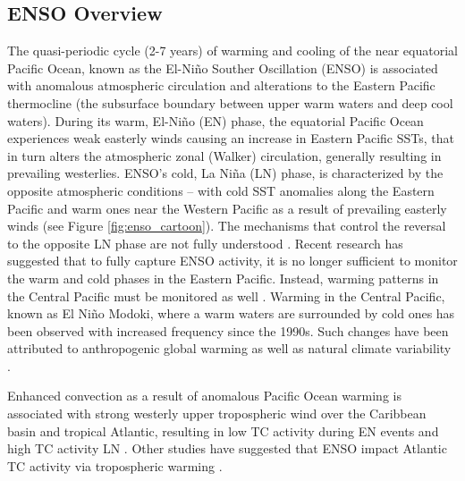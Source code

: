 \documentclass[]{article}
\begin{document}
\subsection{ENSO Overview}
The quasi-periodic cycle (2-7 years) of warming and cooling of the near equatorial Pacific Ocean, known as the El-Ni\~no Souther Oscillation (ENSO) is associated with anomalous atmospheric circulation and alterations to the Eastern Pacific thermocline (the subsurface boundary between upper warm waters and deep cool waters). During its warm, El-Ni\~no (EN) phase, the equatorial Pacific Ocean experiences weak easterly winds causing an increase in Eastern Pacific SSTs, that in turn alters the atmospheric zonal (Walker) circulation, generally resulting in prevailing westerlies. ENSO's cold, La Ni\~na (LN) phase, is characterized by the opposite atmospheric conditions -- with cold SST anomalies along the Eastern Pacific and warm ones near the Western Pacific as a result of prevailing easterly winds (see Figure \ref{fig:enso_cartoon}). The mechanisms that control the reversal to the opposite LN phase are not fully understood \cite{kirtman1997,smith2012}. Recent research has suggested that to fully capture ENSO activity, it is no longer sufficient to monitor the warm and cold phases in the Eastern Pacific. Instead, warming patterns in the Central Pacific must be monitored as well \cite{ashok2007}. Warming in the Central Pacific, known as El Ni\~no Modoki, where a warm waters are surrounded by cold ones has been observed with increased frequency since the 1990s. Such changes have been attributed to anthropogenic global warming \cite{yeh2009} as well as natural climate variability \cite{wittenberg2009}.

Enhanced convection as a result of anomalous Pacific Ocean warming is associated with strong westerly upper tropospheric wind over the Caribbean basin and tropical Atlantic, resulting in low TC activity during EN events and high TC activity LN \cite{gray1984a}. Other studies have suggested that ENSO impact Atlantic TC activity via tropospheric warming \cite{tang2004}. 


\end{document}
